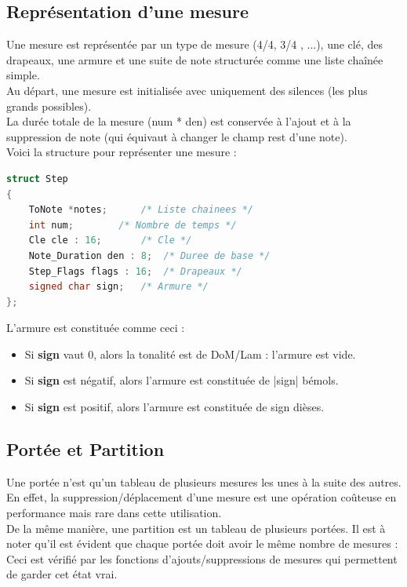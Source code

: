 \documentclass[12pt]{report}
\begin{document}
\subsection{Représentation d'une mesure}
Une mesure est représentée par un type de mesure (4/4, 3/4 , ...), une clé, des drapeaux, une armure et une suite de note structurée
comme une liste chaînée simple.\\Au départ, une mesure est initialisée avec uniquement des silences (les plus grands possibles).\\ La durée totale
de la mesure (num * den) est conservée à l'ajout et à la suppression de note (qui équivaut à changer le champ rest d'une note).\\ \newpage
Voici la structure pour représenter une mesure :\\
\lstset{style=CLangage}
\begin{lstlisting}[language=C]
struct Step
{
	ToNote *notes;		/* Liste chainees */
	int num;		/* Nombre de temps */
	Cle cle : 16;		/* Cle */
	Note_Duration den : 8;	/* Duree de base */
	Step_Flags flags : 16;	/* Drapeaux */
	signed char sign;	/* Armure */
};
\end{lstlisting}
\vskip 0.3in
L'armure est constituée comme ceci :\\
\begin{itemize}
 \item Si \textbf{sign} vaut 0, alors la tonalité est de DoM/Lam : l'armure est vide.\\
 \item Si \textbf{sign} est négatif, alors l'armure est constituée de |sign| bémols.\\
 \item Si \textbf{sign} est positif, alors l'armure est constituée de sign dièses.\\
\end{itemize}

\subsection{Portée et Partition}
Une portée n'est qu'un tableau de plusieurs mesures les unes à la suite des autres. En effet, la suppression/déplacement d'une mesure est une
opération coûteuse en performance mais rare dans cette utilisation.\\
De la même manière, une partition est un tableau de plusieurs portées. Il est à noter qu'il est évident que chaque portée doit avoir le même nombre
de mesures : Ceci est vérifié par les fonctions d'ajouts/suppressions de mesures qui permettent de garder cet état vrai.\\
\end{document}
